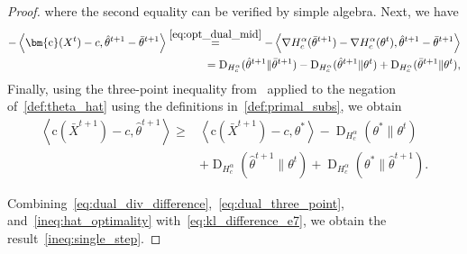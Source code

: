 \documentclass[10pt]{article}
\newcommand{\DHa}{\D_{H_c^\alpha}}
\newcommand{\inner}[2]{\left\langle #1,#2\right\rangle}
\newcommand{\D}{\operatorname{D}}
\theoremstyle{plain}
\theoremstyle{definition}
\theoremstyle{remark}
\newcommand{\col}{\bm{\mathrm{c}}}
\begin{document}
\begin{proof}
    where the second equality can be verified by simple algebra.
    Next, we have
    \begin{align}
        \nonumber-\inner{\col(X^t)-c}{\hat\theta^{t+1}-\bar\theta^{t+1}}\stackrel{\eqref{eq:opt_dual_mid}}=-\inner{\nabla H_c^\alpha(\bar\theta^{t+1})-\nabla H_c^\alpha(\theta^{t})}{\hat\theta^{t+1}-\bar\theta^{t+1}}\\
        =\DHa(\hat\theta^{t+1}\|\bar\theta^{t+1})-\DHa(\hat\theta^{t+1}\|\theta^t)+\DHa(\bar\theta^{t+1}\|\theta^t),\label{eq:dual_three_point}
    \end{align}
    Finally, using the three-point inequality from~\cite[Lemma 3.2]{chenConvergenceAnalysisProximalLike2006} applied to the negation of~\eqref{def:theta_hat} using the definitions in~\eqref{def:primal_subs}, we obtain 
    \begin{align}
        \nonumber\inner{\col(\bar X^{t+1})-c}{\hat\theta^{t+1}}\geq& \inner{\col(\bar X^{t+1})-c}{\theta^*} - \DHa(\theta^*\|\theta^t)\\
        &+\DHa(\hat\theta^{t+1}\|\theta^t)+\DHa(\theta^*\|\hat\theta^{t+1}).\label{ineq:hat_optimality}    \end{align}
   
    
    Combining~\eqref{eq:dual_div_difference},~\eqref{eq:dual_three_point}, and~\eqref{ineq:hat_optimality} with~\eqref{eq:kl_difference_e7}, we obtain the result~\eqref{ineq:single_step}.
\end{proof}
\end{document}
